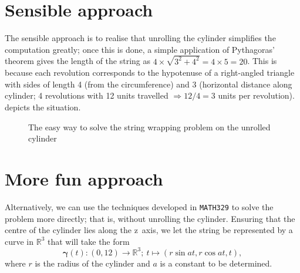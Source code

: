 \documentclass[twocolumn]{article}
\begin{document}
\section{Sensible approach}
The sensible approach is to realise that unrolling the cylinder simplifies the computation greatly; once this is done, a simple application of Pythagoras' theorem gives the length of the string as $4\times \sqrt{3^2+4^2}=4\times 5=20$. This is because each revolution corresponds to the hypotenuse of a right-angled triangle with sides of length 4 (from the circumference) and 3 (horizontal distance along cylinder; 4 revolutions with 12 units travelled $\Rightarrow 12/4=3$ units per revolution).  depicts the situation.
\begin{figure}[htpb]
\centering
{}
\caption{The easy way to solve the string wrapping problem on the unrolled cylinder}
\label{sensible}
\end{figure}

\section{More fun approach}
Alternatively, we can use the techniques developed in \texttt{MATH329} to solve the problem more directly; that is, without unrolling the cylinder. Ensuring that the centre of the cylinder lies along the z~axis, we let the string be represented by a curve in $\mathbb{R}^3$ that will take the form
$$\bm{\gamma}(t): (0,12) \rightarrow \mathbb{R}^3;\ t \mapsto (r\sin{at}, r\cos{at}, t),$$
where $r$ is the radius of the cylinder and $a$ is a constant to be determined.
\end{document}
